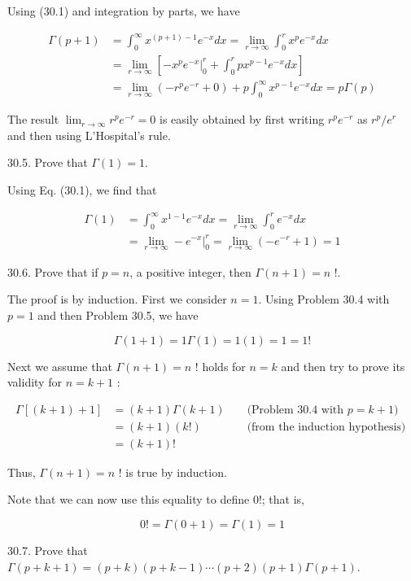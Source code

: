 \documentclass[10pt]{article}
\begin{document}
Using (30.1) and integration by parts, we have

$$
\begin{aligned}
\Gamma(p+1) & =\int_{0}^{\infty} x^{(p+1)-1} e^{-x} d x=\lim _{r \rightarrow \infty} \int_{0}^{r} x^{p} e^{-x} d x \\
& =\lim _{r \rightarrow \infty}\left[-\left.x^{p} e^{-x}\right|_{0} ^{r}+\int_{0}^{r} p x^{p-1} e^{-x} d x\right] \\
& =\lim _{r \rightarrow \infty}\left(-r^{p} e^{-r}+0\right)+p \int_{0}^{\infty} x^{p-1} e^{-x} d x=p \Gamma(p)
\end{aligned}
$$

The result $\lim _{r \rightarrow \infty} r^{p} e^{-r}=0$ is easily obtained by first writing $r^{p} e^{-r}$ as $r^{p} / e^{r}$ and then using L'Hospital's rule.

30.5. Prove that $\Gamma(1)=1$.

Using Eq. (30.1), we find that

$$
\begin{aligned}
\Gamma(1) & =\int_{0}^{\infty} x^{1-1} e^{-x} d x=\lim _{r \rightarrow \infty} \int_{0}^{r} e^{-x} d x \\
& =\lim _{r \rightarrow \infty}-\left.e^{-x}\right|_{0} ^{r}=\lim _{r \rightarrow \infty}\left(-e^{-r}+1\right)=1
\end{aligned}
$$

30.6. Prove that if $p=n$, a positive integer, then $\Gamma(n+1)=n$ !.

The proof is by induction. First we consider $n=1$. Using Problem 30.4 with $p=1$ and then Problem 30.5, we have

$$
\Gamma(1+1)=1 \Gamma(1)=1(1)=1=1 !
$$

Next we assume that $\Gamma(n+1)=n$ ! holds for $n=k$ and then try to prove its validity for $n=k+1$ :

$$
\begin{aligned}
\Gamma[(k+1)+1] & =(k+1) \Gamma(k+1) & & \text { (Problem 30.4 with } p=k+1) \\
& =(k+1)(k !) & & \text { (from the induction hypothesis) } \\
& =(k+1) ! & &
\end{aligned}
$$

Thus, $\Gamma(n+1)=n$ ! is true by induction.

Note that we can now use this equality to define $0 !$; that is,

$$
0 !=\Gamma(0+1)=\Gamma(1)=1
$$

30.7. Prove that $\Gamma(p+k+1)=(p+k)(p+k-1) \cdots(p+2)(p+1) \Gamma(p+1)$.
\end{document}
